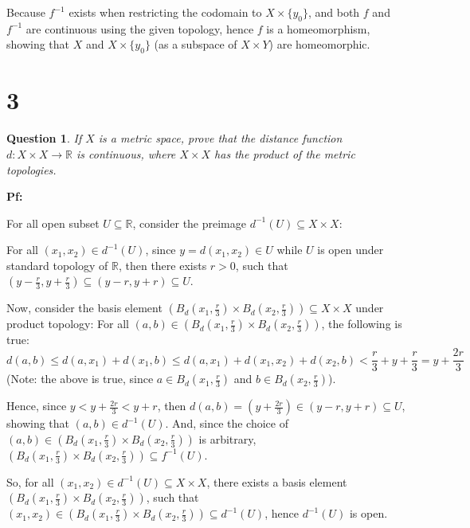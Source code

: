 \documentclass{article}
\newtheorem{question}{Question}
\begin{document}
\hfill

Because $f^{-1}$ exists when restricting the codomain to $X\times \{y_0\}$, and both $f$ and $f^{-1}$ are continuous using the given topology,
hence $f$ is a homeomorphism, showing that $X$ and $X\times \{y_0\}$ (as a subspace of $X\times Y$) are homeomorphic.

\break

\section*{3}
\begin{myBox}[]{}
    \begin{question}
        If $X$ is a metric space, prove that the distance function $d:X\times X\rightarrow \mathbb{R}$ is
        continuous, where $X\times X$ has the product of the metric topologies.
    \end{question}
\end{myBox}

\textbf{Pf:}

For all open subset $U\subseteq \mathbb{R}$, consider the preimage $d^{-1}(U)\subseteq X\times X$:

For all $(x_1,x_2)\in d^{-1}(U)$, since $y=d(x_1,x_2)\in U$ while $U$ is open under standard topology of $\mathbb{R}$, 
then there exists $r>0$, such that $(y-\frac{r}{3},y+\frac{r}{3})\subseteq (y-r,y+r) \subseteq U$.

\hfill

Now, consider the basis element $\left(B_d(x_1,\frac{r}{3})\times B_d(x_2,\frac{r}{3})\right)\subseteq X\times X$ under product topology:
For all $(a,b)\in \left(B_d(x_1,\frac{r}{3})\times B_d(x_2,\frac{r}{3})\right)$, the following is true:
$$d(a,b) \leq d(a,x_1) + d(x_1,b) \leq d(a,x_1)+d(x_1,x_2)+d(x_2,b) < \frac{r}{3}+y+\frac{r}{3} = y+\frac{2r}{3}$$
(Note: the above is true, since $a\in B_d(x_1,\frac{r}{3})$ and $b\in B_d(x_2,\frac{r}{3})$).

Hence, since $y<y+\frac{2r}{3} < y+r$, then $d(a,b)=(y+\frac{2r}{3}) \in (y-r,y+r)\subseteq U$, showing that $(a,b)\in d^{-1}(U)$.
And, since the choice of $(a,b)\in \left(B_d(x_1,\frac{r}{3})\times B_d(x_2,\frac{r}{3})\right)$ is arbitrary, $\left(B_d(x_1,\frac{r}{3})\times B_d(x_2,\frac{r}{3})\right) \subseteq f^{-1}(U)$.

\hfill

So, for all $(x_1,x_2) \in d^{-1}(U) \subseteq X\times X$, there exists a basis element $\left(B_d(x_1,\frac{r}{3})\times B_d(x_2,\frac{r}{3})\right)$, 
such that $(x_1,x_2)\in \left(B_d(x_1,\frac{r}{3})\times B_d(x_2,\frac{r}{3})\right)\subseteq d^{-1}(U)$,
hence $d^{-1}(U)$ is open.
\end{document}
